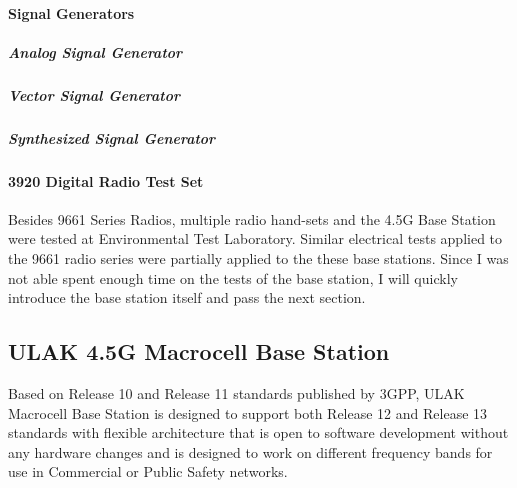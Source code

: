 


\paragraph{Signal Generators}

\subparagraph*{Analog Signal Generator}

\subparagraph*{Vector Signal Generator}

\subparagraph*{Synthesized Signal Generator}

\paragraph{3920 Digital Radio Test Set}


	Besides 9661 Series Radios, multiple radio hand-sets and the 4.5G Base Station were tested at Environmental Test Laboratory. Similar electrical tests applied to the 9661 radio series were partially applied to the these base stations. Since I was not able spent enough time on the tests of the base station, I will quickly introduce the base station itself and pass the next section. 

\subsection{ULAK 4.5G Macrocell Base Station}
\- \indent
	Based on Release 10 and Release 11 standards published by 3GPP, ULAK Macrocell Base Station is designed to support both Release 12 and Release 13 standards with flexible architecture that is open to software development without any hardware changes and is designed to work on different frequency bands for use in Commercial or Public Safety networks\cite{ulak}.  

